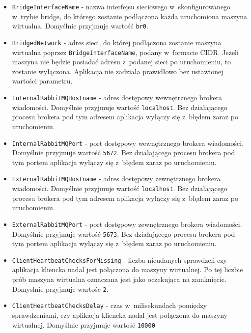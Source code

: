 \documentclass[../opis-rozwiazania.tex]{subfiles}
\begin{document}
\begin{itemize}
  \item \texttt{BridgeInterfaceName} - nazwa interfejsu sieciowego w~skonfigurowanego w~trybie bridge, do którego zostanie podłączona każda uruchomiona maszyna wirtualna. Domyślnie przyjmuje wartość \texttt{br0}.
  \item \texttt{BridgedNetwork} - adres sieci, do której podłączona zostanie maszyna wirtualna poprzez \texttt{BridgeInterfaceName}, podany w~formacie CIDR. Jeżeli maszyna nie będzie posiadać adresu z~podanej sieci po uruchomieniu, to zostanie wyłączona. Aplikacja nie zadziała prawidłowo bez ustawionej wartości parametru.
  \item \texttt{InternalRabbitMQHostname} - adres dostępowy wewnętrznego brokera wiadomości. Domyślnie przyjmuje wartość \texttt{localhost}. Bez działającego procesu brokera pod tym adresem aplikacja wyłączy się z~błędem zaraz po uruchomieniu.
  \item \texttt{InternalRabbitMQPort} - port dostępowy wewnętrznego brokera wiadomości. Domyślnie przyjmuje wartość \texttt{5672}. Bez działającego procesu brokera pod tym portem aplikacja wyłączy się z~błędem zaraz po uruchomieniu.
  \item \texttt{ExternalRabbitMQHostname} - adres dostępowy zewnętrznego brokera wiadomości. Domyślnie przyjmuje wartość \texttt{localhost}. Bez działającego procesu brokera pod tym adresem aplikacja wyłączy się z~błędem zaraz po uruchomieniu.
  \item \texttt{ExternalRabbitMQPort} -  port dostępowy zewnętrznego brokera wiadomości. Domyślnie przyjmuje wartość \texttt{5673}. Bez działającego procesu brokera pod tym portem aplikacja wyłączy się z~błędem zaraz po uruchomieniu.
  \item \texttt{ClientHeartbeatChecksForMissing} - liczba nieudanych sprawdzeń czy aplikacja kliencka nadal jest połączona do maszyny wirtualnej. Po tej liczbie prób maszyna wirtualna oznaczana jest jako oczekująca na zamknięcie. Domyslnie przyjmuje wartośc \texttt{2}.
  \item \texttt{ClientHeartbeatChecksDelay} - czas w~milisekundach pomiędzy sprawdzeniami, czy aplikacja kliencka nadal jest połączona do maszyny wirtualnej. Domyślnie przyjmuje wartość \texttt{10000}
\end{itemize}
\end{document}

